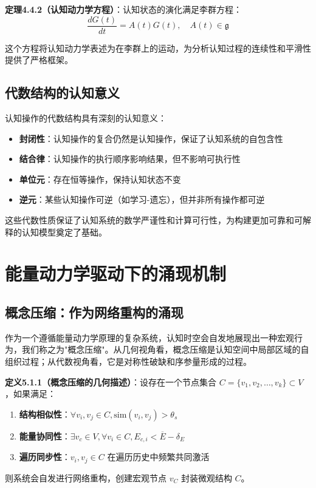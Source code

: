 \documentclass[12pt,a4paper]{article}
\begin{document}
\textbf{定理4.4.2（认知动力学方程）}：认知状态的演化满足李群方程：
\begin{equation}
\frac{dG(t)}{dt} = A(t)G(t), \quad A(t) \in \mathfrak{g}
\end{equation}

这个方程将认知动力学表述为在李群上的运动，为分析认知过程的连续性和平滑性提供了严格框架。

\subsection{代数结构的认知意义}

认知操作的代数结构具有深刻的认知意义：

\begin{itemize}
\item \textbf{封闭性}：认知操作的复合仍然是认知操作，保证了认知系统的自包含性
\item \textbf{结合律}：认知操作的执行顺序影响结果，但不影响可执行性
\item \textbf{单位元}：存在恒等操作，保持认知状态不变
\item \textbf{逆元}：某些认知操作可逆（如学习-遗忘），但并非所有操作都可逆
\end{itemize}

这些代数性质保证了认知系统的数学严谨性和计算可行性，为构建更加可靠和可解释的认知模型奠定了基础。

\section{能量动力学驱动下的涌现机制}

\subsection{概念压缩：作为网络重构的涌现}

作为一个遵循能量动力学原理的复杂系统，认知时空会自发地展现出一种宏观行为，我们称之为"概念压缩"。从几何视角看，概念压缩是认知空间中局部区域的自组织过程；从代数视角看，它是对称性破缺和序参量形成的过程。

\textbf{定义5.1.1（概念压缩的几何描述）}：设存在一个节点集合 $C = \{v_1, v_2, \ldots, v_k\} \subset V$，如果满足：
\begin{enumerate}
\item \textbf{结构相似性}：$\forall v_i, v_j \in C, \text{sim}(v_i, v_j) > \theta_s$
\item \textbf{能量协同性}：$\exists v_c \in V, \forall v_i \in C, E_{c,i} < \overline{E} - \delta_E$
\item \textbf{遍历同步性}：$v_i, v_j \in C$ 在遍历历史中频繁共同激活
\end{enumerate}
则系统会自发进行网络重构，创建宏观节点 $v_C$ 封装微观结构 $C$。
\end{document}
